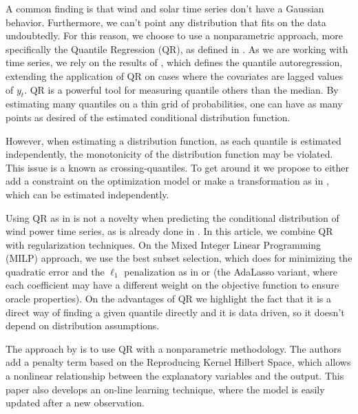 
A common finding is that wind and solar time series don't have a Gaussian behavior. Furthermore, we can't point any distribution that fits on the data undoubtedly. For this reason, we choose to use a nonparametric approach, more specifically the Quantile Regression (QR), as defined in \cite{koenker2005quantile}.
As we are working with time series, we rely on the results of \cite{koenker_quantile_2006}, which defines the quantile autoregression, extending the application of QR on cases where the covariates are lagged values of $y_t$. 
QR is a powerful tool for measuring quantile others than the median. By estimating many quantiles on a thin grid of probabilities, one can have as many points as desired of the estimated conditional distribution function.

However, when estimating a distribution function, as each quantile is estimated independently, the monotonicity of the distribution function may be violated. This issue is a known as crossing-quantiles. To get around it we propose to either add a constraint on the optimization model or make a transformation as in \cite{chernozhukov_quantile_2010}, which can be estimated independently.

Using QR as in \cite{koenker2005quantile} is not a novelty when predicting the conditional distribution of wind power time series, as is already done in \cite{moller_time-adaptive_2008,nielsen2006,bremnes_probabilistic_2004,wan_direct_2017}.
In this article, we combine QR with regularization techniques. On the Mixed Integer Linear Programming (MILP) approach, we use the best subset selection, which \cite{bertsimas_best_2015} does for minimizing the quadratic error and the $\ell_1$ penalization as in \cite{belloni_l1-penalized_2009} or \cite{ciuperca_adaptive_2016} (the AdaLasso variant, where each coefficient may have a different weight on the objective function to ensure oracle properties).
On the advantages of QR we highlight the fact that it is a direct way of finding a given quantile directly and it is data driven, so it doesn't depend on distribution assumptions. 



The approach by \cite{gallego2016line} is to use QR with a nonparametric methodology. The authors add a penalty term based on the Reproducing Kernel Hilbert Space, which allows a nonlinear relationship between the explanatory variables and the output. This paper also develops an on-line learning technique, where the model is easily updated after a new observation.

